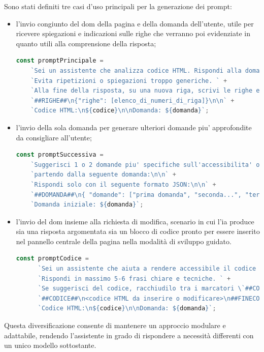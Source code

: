 \noindent Sono stati definiti tre casi d’uso principali per la generazione dei prompt: 
\begin{itemize}
    \item l’invio congiunto del \acrshort{dom} della pagina e della domanda dell’utente, utile per ricevere spiegazioni e indicazioni sulle righe che verranno poi evidenziate in quanto utili alla comprensione della risposta; 
    \begin{lstlisting}[language=JavaScript, caption={Prompt per la generazione di risposta e righe da evidenziare}]
    const promptPrincipale =
    `Sei un assistente che analizza codice HTML. Rispondi alla domanda in modo chiaro ma conciso, usando al massimo 5-6 frasi. ` +
    `Evita ripetizioni o spiegazioni troppo generiche. ` +
    `Alla fine della risposta, su una nuova riga, scrivi le righe eventualmente utilizzate per la risposta nel seguente formato:\n\n` +
    `##RIGHE##\n{"righe": [elenco_di_numeri_di_riga]}\n\n` +
    `Codice HTML:\n${codice}\n\nDomanda: ${domanda}`;
    \end{lstlisting}
    
    \item l'invio della sola domanda per generare ulteriori domande piu' approfondite da consigliare all'utente;
    \begin{lstlisting}[language=JavaScript, caption={Prompt per la generazione di domande successive}]
    const promptSuccessiva =
    `Suggerisci 1 o 2 domande piu' specifiche sull'accessibilita' o sull'analisi del codice, ` +
    `partendo dalla seguente domanda:\n\n` +
    `Rispondi solo con il seguente formato JSON:\n\n` +
    `##DOMANDA##\n{ "domande": ["prima domanda", "seconda...", "terza..."] }\n\n` +
    `Domanda iniziale: ${domanda}`;
    \end{lstlisting}

    
    \item l’invio del \acrshort{dom} insieme alla richiesta di modifica, scenario in cui l’\acrshort{ia} produce sia una risposta argomentata sia un blocco di codice pronto per essere inserito nel pannello centrale della pagina nella modalità di sviluppo guidato.
    \begin{lstlisting}[language=JavaScript, caption={Prompt per la generazione di risposta e codice \acrshort{html} accessibile}]
    const promptCodice =
      `Sei un assistente che aiuta a rendere accessibile il codice HTML. ` +
      `Rispondi in massimo 5-6 frasi chiare e tecniche. ` +
      `Se suggerisci del codice, racchiudilo tra i marcatori \`##CODICE##\` come mostrato di seguito:\n\n` +
      `##CODICE##\n<codice HTML da inserire o modificare>\n##FINECODICE##\n\n` +
      `Codice HTML:\n${codice}\n\nDomanda: ${domanda}`;
    \end{lstlisting}

\end{itemize}
Questa diversificazione consente di mantenere un approccio modulare e adattabile, rendendo l’assistente in grado di rispondere a necessità differenti con un unico modello sottostante.


